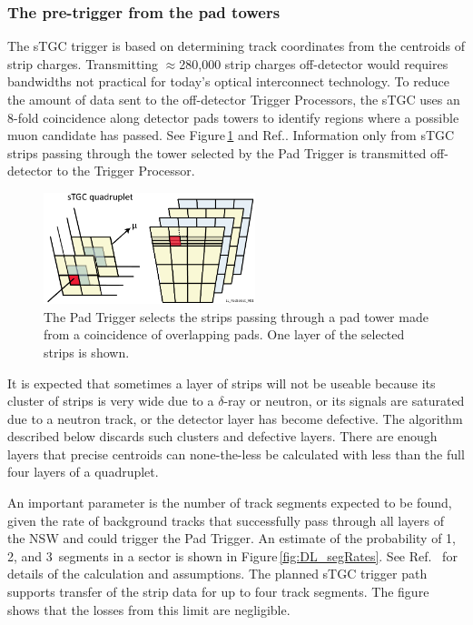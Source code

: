 
\subsubsection{The pre-trigger from the pad towers}

The sTGC trigger is based on determining track coordinates from the centroids of strip charges.
Transmitting $\approx$280,000 strip charges off-detector would requires bandwidths not practical for today's optical interconnect technology.
To reduce the amount of data sent to the off-detector Trigger Processors,
the sTGC uses an 8-fold coincidence along detector pads towers to identify regions where a possible muon candidate has passed.
See Figure\,\ref{fig:LL_PadSelect} and Ref.\cite{padTower}.
Information only from sTGC strips passing through the tower selected by the Pad Trigger is transmitted off-detector to the Trigger Processor.

\begin{figure}[h]
  \centering
  \includegraphics[width=0.55\textwidth]{figures/LL_PadSelect_V01.pdf}
  \caption{The Pad Trigger selects the strips passing through a pad tower made from a coincidence of overlapping pads. One layer of the selected strips is shown.}
  \label{fig:LL_PadSelect}
\end{figure}

It is expected that sometimes a layer of strips will not be useable because its cluster of strips is very wide
due to a $\delta$-ray or neutron, or its signals are saturated due to a neutron track, or the detector layer has become defective.
The algorithm described below discards such clusters and defective layers.
There are enough layers that precise centroids can none-the-less be calculated with less than the full four layers of a quadruplet.

An important parameter is the number of track segments expected to be found,
given the rate of background tracks that successfully pass through all layers of the NSW and could trigger the Pad Trigger.
An estimate of the probability of 1, 2, and 3~segments in a sector is shown in Figure\,\ref{fig:DL_segRates}.
See Ref.~\cite{LellouchRates} for details of the calculation and assumptions.
The planned sTGC trigger path supports transfer of the strip data for up to four track segments.
The figure shows that the losses from this limit are negligible.

